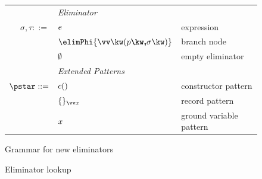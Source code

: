 \begin{figure}
   \begin{minipage}[t]{0.7\textwidth}
      \begin{tabularx}{\textwidth}{rL{2.7cm}L{3cm}}
          &\textit{Eliminator}&
          \\
          $\sigma, \tau ::=$
          &
          $e$
          &
          expression
          \\
          &
          $\elimPhi{\seq{\exPair{p}{\sigma}}}$
          &
          branch node
          \\
          &
          $\emptyset$
          &
          empty eliminator
          \\
          &\textit{Extended Patterns}&
          \\
          $\pstar ::=$
          &
          $c()$
          &
          constructor pattern
          \\
          &
          $\exRecord{}_{\seq{x}}$
          &
          record pattern
          \\
          &
          $x$
          &
          ground variable pattern
          \\
      \end{tabularx}
   \end{minipage}
\caption{Grammar for new eliminators}
\end{figure}

\begin{figure}
   {\small \flushleft {}
   }
   \caption{Eliminator lookup}
\end{figure}

